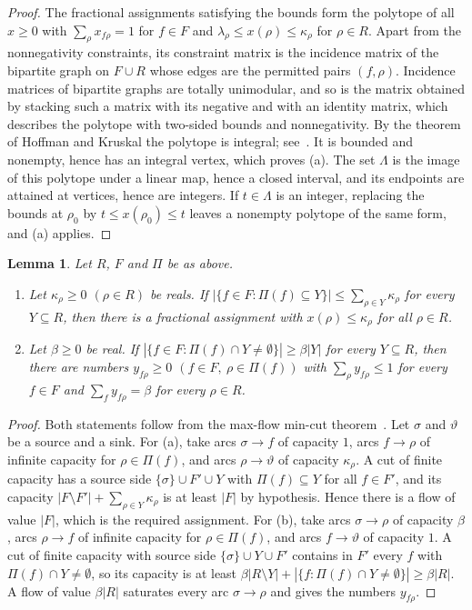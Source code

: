 \documentclass{amsart}
\numberwithin{equation}{section}
\newtheorem{lemma}[theorem]{Lemma}
\theoremstyle{definition}
\theoremstyle{remark}
\begin{document}
\begin{proof}
The fractional assignments satisfying the bounds form the polytope of all $x\ge 0$ with $\sum_\rho x_{f\rho}=1$ for $f\in F$ and $\lambda_\rho\le x(\rho)\le\kappa_\rho$ for $\rho\in R$. Apart from the nonnegativity constraints, its constraint matrix is the incidence matrix of the bipartite graph on $F\cup R$ whose edges are the permitted pairs $(f,\rho)$. Incidence matrices of bipartite graphs are totally unimodular, and so is the matrix obtained by stacking such a matrix with its negative and with an identity matrix, which describes the polytope with two-sided bounds and nonnegativity. By the theorem of Hoffman and Kruskal the polytope is integral; see~\cite{Sch03}. It is bounded and nonempty, hence has an integral vertex, which proves (a). The set $\Lambda$ is the image of this polytope under a linear map, hence a closed interval, and its endpoints are attained at vertices, hence are integers. If $t\in\Lambda$ is an integer, replacing the bounds at $\rho_0$ by $t\le x(\rho_0)\le t$ leaves a nonempty polytope of the same form, and (a) applies.
\end{proof}

\begin{lemma}\label{lem:hall}
Let $R$, $F$ and $\Pi$ be as above.
\begin{enumerate}[label=\textup{(\alph*)}]
\item Let $\kappa_\rho\ge 0$ $(\rho\in R)$ be reals. If $|\{f\in F:\Pi(f)\subseteq Y\}|\le\sum_{\rho\in Y}\kappa_\rho$ for every $Y\subseteq R$, then there is a fractional assignment with $x(\rho)\le\kappa_\rho$ for all $\rho\in R$.
\item Let $\beta\ge 0$ be real. If $|\{f\in F:\Pi(f)\cap Y\ne\emptyset\}|\ge\beta|Y|$ for every $Y\subseteq R$, then there are numbers $y_{f\rho}\ge0$ $(f\in F,\ \rho\in\Pi(f))$ with $\sum_\rho y_{f\rho}\le 1$ for every $f\in F$ and $\sum_{f}y_{f\rho}=\beta$ for every $\rho\in R$.
\end{enumerate}
\end{lemma}

\begin{proof}
Both statements follow from the max-flow min-cut theorem~\cite{Sch03}. Let $\sigma$ and $\vartheta$ be a source and a sink. For (a), take arcs $\sigma\to f$ of capacity $1$, arcs $f\to\rho$ of infinite capacity for $\rho\in\Pi(f)$, and arcs $\rho\to\vartheta$ of capacity $\kappa_\rho$. A cut of finite capacity has a source side $\{\sigma\}\cup F'\cup Y$ with $\Pi(f)\subseteq Y$ for all $f\in F'$, and its capacity $|F\setminus F'|+\sum_{\rho\in Y}\kappa_\rho$ is at least $|F|$ by hypothesis. Hence there is a flow of value $|F|$, which is the required assignment. For (b), take arcs $\sigma\to\rho$ of capacity $\beta$, arcs $\rho\to f$ of infinite capacity for $\rho\in\Pi(f)$, and arcs $f\to\vartheta$ of capacity $1$. A cut of finite capacity with source side $\{\sigma\}\cup Y\cup F'$ contains in $F'$ every $f$ with $\Pi(f)\cap Y\ne\emptyset$, so its capacity is at least $\beta|R\setminus Y|+|\{f:\Pi(f)\cap Y\ne\emptyset\}|\ge\beta|R|$. A flow of value $\beta|R|$ saturates every arc $\sigma\to\rho$ and gives the numbers $y_{f\rho}$.
\end{proof}
\end{document}
